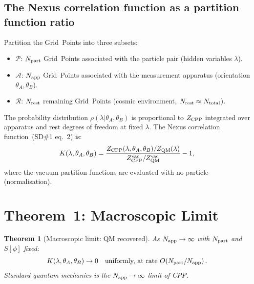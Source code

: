 \documentclass[11pt,letterpaper]{article}
\newtheorem{theorem}{Theorem}[section]
\newcommand{\Napp}{N_{\rm app}}
\newcommand{\Npart}{N_{\rm part}}
\newcommand{\Ntot}{N_{\rm total}}
\begin{document}
\subsection{The Nexus correlation function as a partition function ratio}

Partition the Grid~Points into three subsets:
\begin{itemize}
\item $\mathcal{P}$: $\Npart$ Grid~Points associated with the
  particle pair (hidden variables $\lambda$).
\item $\mathcal{A}$: $\Napp$ Grid~Points associated with the
  measurement apparatus (orientation $\theta_A, \theta_B$).
\item $\mathcal{R}$: $N_{\rm rest}$ remaining Grid~Points (cosmic
  environment, $N_{\rm rest} \approx \Ntot$).
\end{itemize}

The probability distribution $\rho(\lambda|\theta_A,\theta_B)$
is proportional to $Z_{\rm CPP}$ integrated over apparatus and
rest degrees of freedom at fixed $\lambda$.  The Nexus correlation
function~(SD\#1 eq.~2) is:
\begin{equation}
K(\lambda,\theta_A,\theta_B)
= \frac{Z_{\rm CPP}(\lambda,\theta_A,\theta_B)
  / Z_{\rm QM}(\lambda)}
       {Z_{\rm CPP}^{\rm vac} / Z_{\rm QM}^{\rm vac}}
  - 1,
\label{eq:K_def}
\end{equation}
where the vacuum partition functions are evaluated with no particle
(normalisation).

\section{Theorem~1: Macroscopic Limit}
\label{sec:macro}

\begin{theorem}[Macroscopic limit: QM recovered]
\label{thm:macro}
As $\Napp \to \infty$ with $\Npart$ and $S[\phi]$ fixed:
\begin{equation}
K(\lambda,\theta_A,\theta_B) \to 0
\quad \text{uniformly, at rate } O\!\left(\Npart/\Napp\right).
\label{eq:K_macro}
\end{equation}
Standard quantum mechanics is the $\Napp \to \infty$ limit of CPP.
\end{theorem}
\end{document}
